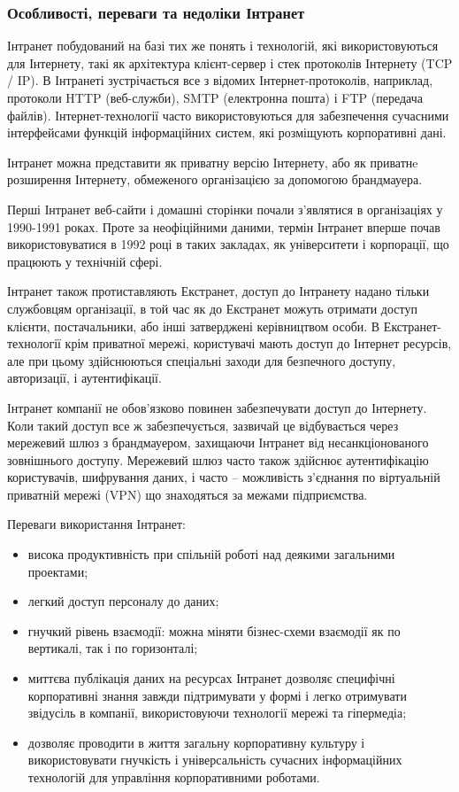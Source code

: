 \subsubsection{Особливості, переваги та недоліки Інтранет}
Інтранет побудований на базі тих же понять і технологій, які використовуються для Інтернету, такі як архітектура клієнт-сервер і стек протоколів Інтернету (TCP / IP). 
В Інтранеті зустрічається все з відомих Інтернет-протоколів, наприклад, протоколи HTTP (веб-служби), SMTP (електронна пошта) і FTP (передача файлів). 
Інтернет-технології часто використовуються для забезпечення сучасними інтерфейсами функцій інформаційних систем, які розміщують корпоративні дані.
\par Інтранет можна представити як приватну версію Інтернету, або як приватнe розширення Інтернету, обмеженого організацією за допомогою брандмауера. 
\par Перші Інтранет веб-сайти і домашні сторінки почали з'являтися в організаціях у 1990-1991 роках. 
Проте за неофіційними даними, термін Інтранет вперше почав використовуватися в 1992 році в таких закладах, як університети і корпорації, що працюють у технічній сфері.
\par Інтранет також протиставляють Екстранет, доступ до Інтранету надано тільки службовцям організації, в той час як до Екстранет можуть отримати доступ клієнти, постачальники, або інші затверджені керівництвом особи. 
В Екстранет-технології крім приватної мережі, користувачі мають доступ до Інтернет ресурсів, але при цьому здійснюються спеціальні заходи для безпечного доступу, авторизації, і аутентифікації.
\par Інтранет компанії не обов'язково повинен забезпечувати доступ до Інтернету. 
Коли такий доступ все ж забезпечується, зазвичай це відбувається через мережевий шлюз з брандмауером, захищаючи Інтранет від несанкціонованого зовнішнього доступу. 
Мережевий шлюз часто також здійснює аутентифікацію користувачів, шифрування даних, і часто -- можливість з'єднання по віртуальній приватній мережі (VPN) що знаходяться за межами підприємства.

Переваги використання Інтранет:
\begin{itemize}
\item висока продуктивність при спільній роботі над деякими загальними проектами;
\item легкий доступ персоналу до даних;
\item гнучкий рівень взаємодії: можна міняти бізнес-схеми взаємодії як по вертикалі, так і по горизонталі;
\item миттєва публікація даних на ресурсах Інтранет дозволяє специфічні корпоративні знання завжди підтримувати у формі і легко отримувати звідусіль в компанії, використовуючи технології мережі та гіпермедіа;
\item дозволяє проводити в життя загальну корпоративну культуру і використовувати гнучкість і універсальність сучасних інформаційних технологій для управління корпоративними роботами.
\end{itemize}



